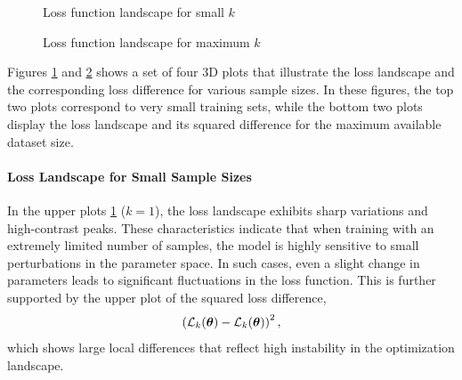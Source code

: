 \documentclass{article}
\begin{document}
\begin{figure}[!htbp]
  \hspace*{-2.2cm}
  \caption{Loss function landscape for small $k$}
  \label{fig:loss_random_small}
\end{figure}

\begin{figure}[!htbp]
  \hspace*{-2.2cm}
  \caption{Loss function landscape for maximum $k$}
  \label{fig:loss_random_big}
\end{figure}

Figures \ref{fig:loss_random_small} and \ref{fig:loss_random_big} shows a set of four 3D plots that illustrate the loss
landscape and the corresponding loss difference for various sample sizes. In these figures, the top two plots correspond to very small
training sets, while the bottom two plots display the loss landscape and its squared difference for the maximum available dataset size.

\paragraph{Loss Landscape for Small Sample Sizes}
In the upper plots \ref{fig:loss_random_small} ($k=1$), the loss landscape exhibits sharp variations and high-contrast peaks.
These characteristics indicate that when training with an extremely limited number of samples, the model is highly sensitive to small
perturbations in the parameter space. In such cases, even a slight change in parameters leads to significant fluctuations in the loss
function. This is further supported by the upper plot of the squared loss difference,
$$\left(\mathcal{L}_k(\boldsymbol{\theta})-\mathcal{L}_{k}(\boldsymbol{\theta})\right)^2,$$
which shows large local differences that reflect high instability in the optimization landscape.
\end{document}
